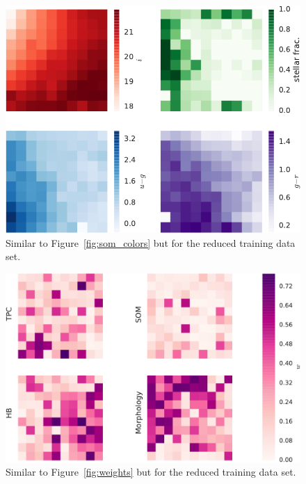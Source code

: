 \begin{figure}[htp]
  \centering
  \includegraphics[width=0.7\linewidth]{figures/som_colors_cut.pdf}
  \caption{Similar to Figure~\ref{fig:som_colors}
           but for the reduced training data set. }
  \label{fig:som_colors_cut}
\end{figure}

\begin{figure}[htp]
  \centering
  \includegraphics[width=0.8\linewidth]{figures/weights_cut.pdf}
  \caption{Similar to Figure~\ref{fig:weights}
           but for the reduced training data set. }
  \label{fig:weights_cut}
\end{figure}

